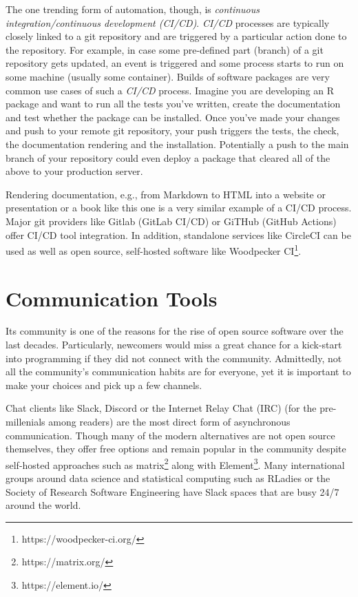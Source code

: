 \documentclass[
  12pt,
  letterpaper,
]{krantz}
\begin{document}
The one trending form of automation, though, is
\emph{continuous integration/continuous development
(CI/CD)}. \emph{CI/CD} processes are typically
closely linked to a git  repository and are
triggered by a particular action done to the repository. For example, in
case some pre-defined part (branch) of a git repository gets updated, an
event is triggered and some process starts to run on some machine
(usually some container). Builds of software packages are very common
use cases of such a \emph{CI/CD} process. Imagine you are
developing an R package and want to run all the tests you've written,
create the documentation and test whether the package can be installed.
Once you've made your changes and push to your remote git repository,
your push triggers the tests, the check, the documentation rendering and
the installation. Potentially a push to the main branch of your
repository could even deploy a package that cleared all of the above to
your production server.

Rendering documentation, e.g., from Markdown to HTML into a
website or presentation or a book like this one is a very similar
example of a CI/CD process. Major git providers like Gitlab
(GitLab CI/CD) or GiTHub (GitHub Actions) offer
CI/CD tool integration. In addition, standalone services
like CircleCI can be used as well as open source, self-hosted software
like Woodpecker CI\footnote{https://woodpecker-ci.org/}.

\hypertarget{communication-tools}{%
\section{Communication Tools}\label{communication-tools}}

Its community is one of the reasons for the rise of open source software
over the last decades. Particularly, newcomers would miss a great chance
for a kick-start into programming if they did not connect with the
community. Admittedly, not all the community's communication habits are
for everyone, yet it is important to make your choices and pick up a few
channels.

Chat clients like Slack, Discord or the Internet Relay Chat (IRC) (for
the pre-millenials among readers) are the most direct form of
asynchronous communication. Though many of the modern alternatives are
not open source themselves, they offer free options and remain popular
in the community despite self-hosted approaches such as
matrix\footnote{https://matrix.org/} along with Element\footnote{https://element.io/}.
Many international groups around data science and statistical computing
such as RLadies or the Society of Research Software Engineering have
Slack spaces that are busy 24/7 around the world.
\end{document}
